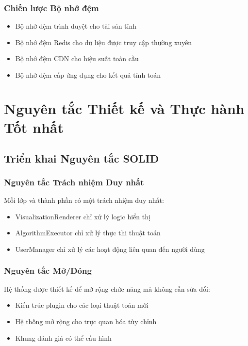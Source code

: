 \subsubsection{Chiến lược Bộ nhớ đệm}
\begin{itemize}
    \item Bộ nhớ đệm trình duyệt cho tài sản tĩnh
    \item Bộ nhớ đệm Redis cho dữ liệu được truy cập thường xuyên
    \item Bộ nhớ đệm CDN cho hiệu suất toàn cầu
    \item Bộ nhớ đệm cấp ứng dụng cho kết quả tính toán
\end{itemize}

\section{Nguyên tắc Thiết kế và Thực hành Tốt nhất}
\label{sec:design-principles}

\subsection{Triển khai Nguyên tắc SOLID}

\subsubsection{Nguyên tắc Trách nhiệm Duy nhất}
Mỗi lớp và thành phần có một trách nhiệm duy nhất:
\begin{itemize}
    \item VisualizationRenderer chỉ xử lý logic hiển thị
    \item AlgorithmExecutor chỉ xử lý thực thi thuật toán
    \item UserManager chỉ xử lý các hoạt động liên quan đến người dùng
\end{itemize}

\subsubsection{Nguyên tắc Mở/Đóng}
Hệ thống được thiết kế để mở rộng chức năng mà không cần sửa đổi:
\begin{itemize}
    \item Kiến trúc plugin cho các loại thuật toán mới
    \item Hệ thống mở rộng cho trực quan hóa tùy chỉnh
    \item Khung đánh giá có thể cấu hình
\end{itemize}

